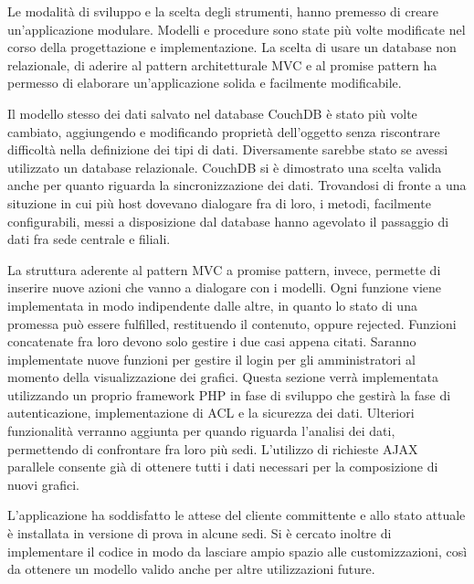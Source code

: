 Le modalità di sviluppo e la scelta degli strumenti, hanno premesso di creare
un'applicazione modulare. Modelli e procedure sono state più volte modificate
nel corso della progettazione e implementazione. La scelta di usare un database
non relazionale, di aderire al pattern architetturale \acf{MVC} e al promise
pattern ha permesso di elaborare un'applicazione solida e facilmente
modificabile. 

Il modello stesso dei dati salvato nel database
CouchDB è stato più volte cambiato, aggiungendo e modificando proprietà
dell'oggetto senza riscontrare difficoltà nella definizione dei tipi di dati.
Diversamente sarebbe stato se avessi utilizzato un database relazionale. CouchDB
si è dimostrato una scelta valida anche per quanto riguarda la sincronizzazione
dei dati. Trovandosi di fronte a una situzione in cui più host dovevano
dialogare fra di loro, i metodi, facilmente configurabili, messi a disposizione
dal database hanno agevolato il passaggio di dati fra sede centrale e filiali.

La struttura aderente al pattern \ac{MVC} a promise pattern, invece, permette di
inserire nuove azioni che vanno a dialogare con i modelli. Ogni funzione viene
implementata in modo indipendente dalle altre, in quanto lo stato di una
promessa può essere fulfilled, restituendo il contenuto, oppure rejected.
Funzioni concatenate fra loro devono solo gestire i due casi appena citati.
Saranno implementate nuove funzioni per gestire il login per gli amministratori
al momento della visualizzazione dei grafici.
Questa sezione verrà implementata utilizzando un proprio framework \ac{PHP} in
fase di sviluppo che gestirà la fase di autenticazione, implementazione di \ac{ACL} e
la sicurezza dei dati. Ulteriori funzionalità verranno aggiunta per quando
riguarda l'analisi dei dati, permettendo di confrontare fra loro più sedi.
L'utilizzo di richieste \acf{AJAX} parallele consente già di
ottenere tutti i dati necessari per la composizione di nuovi grafici.

L'applicazione ha soddisfatto le attese del cliente committente e allo stato
attuale è installata in versione di prova in alcune sedi. Si è cercato inoltre
di implementare il codice in modo da lasciare ampio spazio alle customizzazioni,
così da ottenere un modello valido anche per altre utilizzazioni future. 
\newpage
